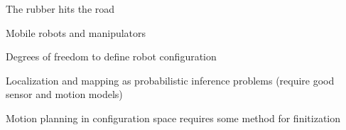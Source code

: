 \documentclass{article}
\begin{document}
\begin{huge}

\vspace*{0.3in}

\maxfigwidth
{}



\vspace*{0.3in}

\textwidth
\centerline{}


\vspace*{0.3in}

\textwidth
\centerline{}




\vspace*{0.3in}

\textwidth
\centerline{}



The rubber hits the road

Mobile robots and manipulators

Degrees of freedom to define robot configuration

Localization and mapping as probabilistic inference problems\al
  (require good sensor and motion models)

Motion planning in configuration space\al
  requires some method for finitization



\end{huge}
\end{document}
